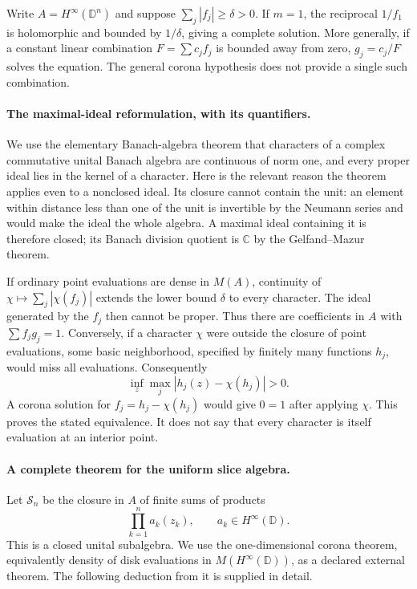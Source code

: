 \documentclass[11pt]{article}
\begin{document}
Write $A=H^\infty(\mathbb D^n)$ and suppose
$\sum_j|f_j|\geq\delta>0$. If $m=1$, the reciprocal $1/f_1$ is
holomorphic and bounded by $1/\delta$, giving a complete solution.
More generally, if a constant linear combination $F=\sum c_jf_j$
is bounded away from zero, $g_j=c_j/F$ solves the equation. The
general corona hypothesis does not provide a single such combination.

\paragraph{The maximal-ideal reformulation, with its quantifiers.}
We use the elementary Banach-algebra theorem that characters of a
complex commutative unital Banach algebra are continuous of norm one,
and every proper ideal lies in the kernel of a character. Here is
the relevant reason the theorem applies even to a nonclosed ideal.
Its closure cannot contain the unit: an element within distance less
than one of the unit is invertible by the Neumann series and would
make the ideal the whole algebra. A maximal ideal containing it is
therefore closed; its Banach division quotient is $\mathbb C$ by the
Gelfand--Mazur theorem.

If ordinary point evaluations are dense in $M(A)$, continuity of
$\chi\mapsto\sum_j|\chi(f_j)|$ extends the lower bound $\delta$
to every character. The ideal generated by the $f_j$ then cannot
be proper. Thus there are coefficients in $A$ with $\sum f_jg_j=1$.
Conversely, if a character $\chi$ were outside the closure of point
evaluations, some basic neighborhood, specified by finitely many
functions $h_j$, would miss all evaluations. Consequently
\[
 \inf_z\max_j|h_j(z)-\chi(h_j)|>0.
\]
A corona solution for $f_j=h_j-\chi(h_j)$ would give $0=1$ after
applying $\chi$. This proves the stated equivalence. It does not
say that every character is itself evaluation at an interior point.

\paragraph{A complete theorem for the uniform slice algebra.}
Let $\mathcal S_n$ be the closure in $A$ of finite sums of products
\[
 \prod_{k=1}^n a_k(z_k),\qquad a_k\in H^\infty(\mathbb D).
 \tag{349.1}
\]
This is a closed unital subalgebra. We use the one-dimensional corona
theorem, equivalently density of disk evaluations in
$M(H^\infty(\mathbb D))$, as a declared external theorem. The
following deduction from it is supplied in detail.
\end{document}
